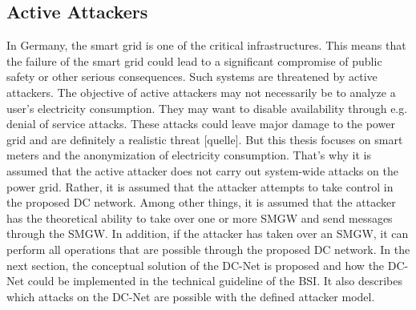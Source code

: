 \subsection{Active Attackers}
In Germany, the smart grid is one of the critical infrastructures. This means that the failure of the smart grid could lead to a significant compromise of public safety or other serious consequences. Such systems are threatened by active attackers. The objective of active attackers may not necessarily be to analyze a user's electricity consumption. They may want to disable availability through e.g. denial of service attacks. These attacks could leave major damage to the power grid and are definitely a realistic threat [quelle]. But this thesis focuses on smart meters and the anonymization of electricity consumption. That's why it is assumed that the active attacker does not carry out system-wide attacks on the power grid. Rather, it is assumed that the attacker attempts to take control in the proposed DC network. Among other things, it is assumed that the attacker has the theoretical ability to take over one or more SMGW and send messages through the SMGW. In addition, if the attacker has taken over an SMGW, it can perform all operations that are possible through the proposed DC network. In the next section, the conceptual solution of the DC-Net is proposed and how the DC-Net could be implemented in the technical guideline of the BSI. It also describes which attacks on the DC-Net are possible with the defined attacker model.

\cleardoublepage

